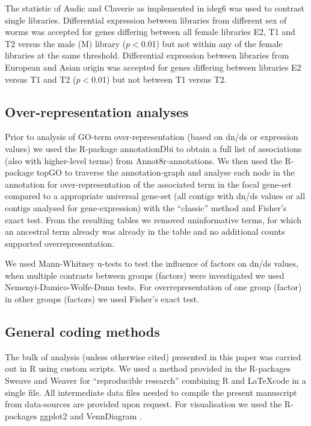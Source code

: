 \documentclass[10pt]{bmc_article}
\newenvironment{bmcformat}{\begin{raggedright}\baselineskip20pt\sloppy\setboolean{publ}{false}}{\end{raggedright}\baselineskip20pt\sloppy}
\begin{document}
\begin{bmcformat}

The statistic of Audic and Claverie \cite{pmid9331369} as implemented
in ideg6 \cite{pmid12429865} was used to contrast single
libraries. Differential expression between libraries from different sex
of worms was accepted for genes differing between all female
libraries E2, T1 and T2 versus the male (M) library ($p<$0.01) but not
within any of the female libraries at the same threshold. Differential
expression between libraries from European and Asian origin was
accepted for genes differing between libraries E2 versus T1 and T2
($p<$0.01) but not between T1 versus T2.

\subsection*{Over-representation analyses}

Prior to analysis of GO-term over-representation (based on dn/ds or
expression values) we used the R-package annotationDbi
\cite{AnnotationDbi} to obtain a full list of associations (also with
higher-level terms) from Annot8r-annotations. We then used the
R-package topGO \cite{topGO} to traverse the annotation-graph and
analyse each node in the annotation for over-representation of the
associated term in the focal gene-set compared to a appropriate
universal gene-set (all contigs with dn/ds values or all contigs
analysed for gene-expression) with the ``classic'' method and Fisher's
exact test. From the resulting tables we removed uninformative terms,
for which an ancestral term already was already in the table and no
additional counts supported overrepresentation.

We used Mann-Whitney u-tests to test the influence of factors on dn/ds
values, when multiple contrasts between groups (factors) were
investigated we used Nemenyi-Damico-Wolfe-Dunn tests. For
overrepresentation of one group (factor) in other groups (factors) we
used Fisher's exact test.

\subsection*{General coding methods}

The bulk of analysis (unless otherwise cited) presented in this paper
was carried out in R \cite{R_project} using custom scripts. We used a
method provided in the R-packages Sweave
\cite{lmucs-papers:Leisch:2002} and Weaver \cite{weaver} for
``reproducible research'' combining R and \LaTeX code in a single
file. All intermediate data files needed to compile the present
manuscript from data-sources are provided upon request. For
visualisation we used the R-packages ggplot2 \cite{ggplot-book} and
VennDiagram \cite{pmid21269502}.



\end{bmcformat}
\end{document}
